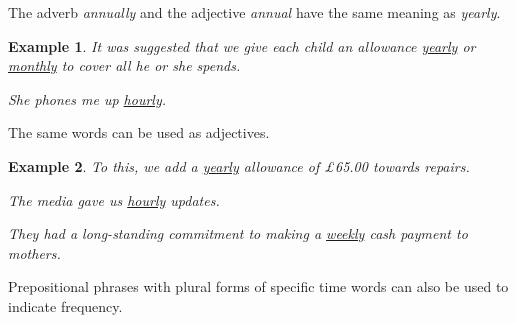 \documentclass[oneside]{book}
\numberwithin{equation}{section}
\newtheorem{example}{Example}[section]
\begin{document}
The adverb \textit{annually} and the adjective \textit{annual} have the same meaning as \textit{yearly}.
\begin{example}
    It was suggested that we give each child an allowance \underline{yearly} or \underline{monthly} to cover all he or she spends.
    
    She phones me up \underline{hourly}.
\end{example}
The same words can be used as adjectives.
\begin{example}
    To this, we add a \underline{yearly} allowance of \pounds65.00 towards repairs.
    
    The media gave us \underline{hourly} updates.
    
    They had a long-standing commitment to making a \underline{weekly} cash payment to mothers.
\end{example}
%
\noindent{} Prepositional phrases with plural forms of specific time words can also be used to indicate frequency.
\end{document}
